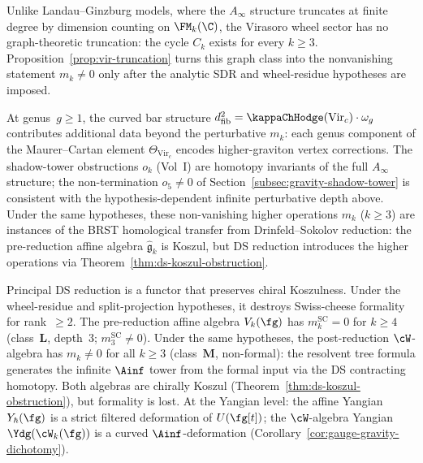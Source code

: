 \begin{remark}
Unlike Landau--Ginzburg models, where the $A_\infty$ structure
truncates at finite degree by dimension counting on $\FM_k(\C)$,
the Virasoro wheel sector has no graph-theoretic truncation: the
cycle $C_k$ exists for every $k\ge3$. Proposition~\ref{prop:vir-truncation}
turns this graph class into the nonvanishing statement
$m_k\ne0$ only after the analytic SDR and wheel-residue hypotheses are
imposed.

At genus~$g \ge 1$, the curved bar structure
$d^2_{\mathrm{fib}} = \kappaChHodge(\mathrm{Vir}_c) \cdot \omega_g$
contributes additional data beyond the perturbative $m_k$: each
genus component of the Maurer--Cartan element $\Theta_{\mathrm{Vir}_c}$
encodes higher-graviton vertex corrections. The shadow-tower
obstructions $o_k$ (Vol~I) are homotopy invariants of the full
$A_\infty$ structure; the non-termination $o_5 \ne 0$ of
Section~\ref{subsec:gravity-shadow-tower} is consistent with the
hypothesis-dependent infinite perturbative depth above.
Under the same hypotheses, these non-vanishing higher operations
$m_k$ ($k \ge 3$) are instances of the BRST homological transfer from
Drinfeld--Sokolov reduction: the pre-reduction affine algebra
$\hat{\mathfrak{g}}_k$ is Koszul, but DS reduction introduces the
higher operations via Theorem~\ref{thm:ds-koszul-obstruction}.
\end{remark}

\begin{remark}%
\label{rem:ds-koszul-formality-scissors}%
%
Principal DS reduction is a functor that preserves chiral
Koszulness. Under the wheel-residue and split-projection hypotheses,
it destroys Swiss-cheese formality for rank~$\ge 2$.
The pre-reduction affine algebra $V_k(\fg)$ has
$m_k^{\mathrm{SC}} = 0$ for $k \ge 4$ (class~$\mathbf{L}$, depth~$3$; $m_3^{\mathrm{SC}} \neq 0$).
Under the same hypotheses, the post-reduction $\cW$-algebra has
$m_k \neq 0$ for all $k \ge 3$ (class~$\mathbf{M}$, non-formal): the
resolvent tree formula generates the infinite $\Ainf$ tower from the
formal input via the DS contracting homotopy. Both algebras
are chirally Koszul (Theorem~\ref{thm:ds-koszul-obstruction}),
but formality is lost. At the Yangian level: the affine
Yangian $Y_\hbar(\fg)$ is a strict filtered deformation of
$U(\fg[t])$; the $\cW$-algebra Yangian $\Ydg(\cW_k(\fg))$ is
a curved $\Ainf$-deformation
(Corollary~\ref{cor:gauge-gravity-dichotomy}).
\end{remark}

